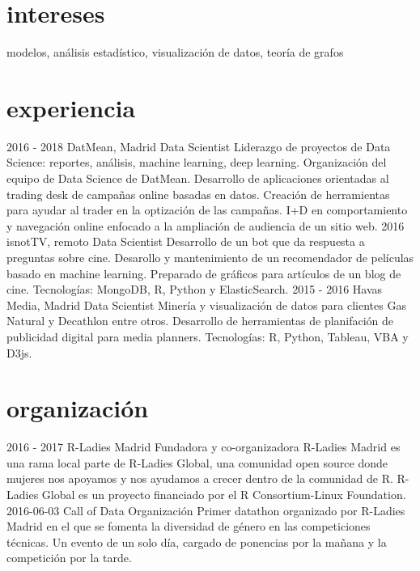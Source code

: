 \documentclass[]{friggeri-cv}
\begin{document}
\section{intereses}

modelos, análisis estadístico, visualización de datos, teoría de grafos

\section{experiencia}

\begin{entrylist}
  \entry
    {2016 - 2018}
    {DatMean, Madrid}
    {Data Scientist}
    {Liderazgo de proyectos de Data Science: reportes, análisis, machine learning, deep learning. Organización del equipo de Data Science de DatMean. Desarrollo de aplicaciones orientadas al trading desk de campañas online basadas en datos. Creación de herramientas para ayudar al trader en la optización de las campañas. I+D en comportamiento y navegación online enfocado a la ampliación de audiencia de un sitio web.}
  \entry
    {2016}
    {isnotTV, remoto}
    {Data Scientist}
    {Desarrollo de un bot que da respuesta a preguntas sobre cine. Desarollo y mantenimiento de un recomendador de películas basado en machine learning. Preparado de gráficos para artículos de un blog de cine. Tecnologías: MongoDB, R, Python y ElasticSearch.}
  \entry
    {2015 - 2016}
    {Havas Media, Madrid}
    {Data Scientist}
    {Minería y visualización de datos para clientes Gas Natural y Decathlon entre otros. Desarrollo de herramientas de planifación de publicidad digital para media planners. Tecnologías: R, Python, Tableau, VBA y D3js.}
\end{entrylist}

\section{organización}

\begin{entrylist}
  \entry
    {2016 - 2017}
    {R-Ladies Madrid}
    {Fundadora y co-organizadora}
    {R-Ladies Madrid es una rama local parte de R-Ladies Global, una comunidad open source donde mujeres nos apoyamos y nos ayudamos a crecer dentro de la comunidad de R. R-Ladies Global es un proyecto financiado por el R Consortium-Linux Foundation.}
  \entry
    {2016-06-03}
    {Call of Data}
    {Organización}
    {Primer datathon organizado por R-Ladies Madrid en el que se fomenta la diversidad de género en las competiciones técnicas. Un evento de un solo día, cargado de ponencias por la mañana y la competición por la tarde.}
\end{entrylist}
\end{document}
